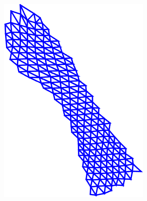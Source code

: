 \begin{figure}[t!]
\begin{subfigure}[b]{0.1\textwidth}
    \end{subfigure}
   	\hfill
    \begin{subfigure}[b]{0.1\textwidth}
            \includegraphics[width=\textwidth]{resources/Fig_Flows/2}
    \end{subfigure}
    \\
    \begin{subfigure}[b]{0.1\textwidth}

\end{subfigure}
\end{figure}
